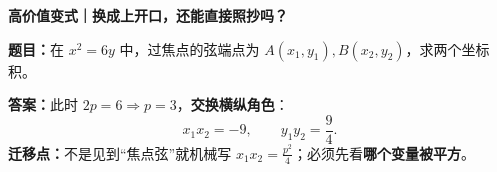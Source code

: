 \clearpage
\begin{examplebox}

\textbf{\textcolor{CExample}{高价值变式｜换成上开口，还能直接照抄吗？}}\par\smallskip
\textbf{题目：}在 $x^2=6y$ 中，过焦点的弦端点为 $A(x_1,y_1),B(x_2,y_2)$，求两个坐标积。\par\smallskip
\textbf{答案：}此时 $2p=6\Rightarrow p=3$，\textbf{交换横纵角色}：
\[
 \boxed{x_1x_2=-9},\qquad
 \boxed{y_1y_2=\frac94}.
\]
\textbf{迁移点：}不是见到“焦点弦”就机械写 $x_1x_2=\frac{p^2}{4}$；必须先看\textbf{哪个变量被平方}。


\end{examplebox}
